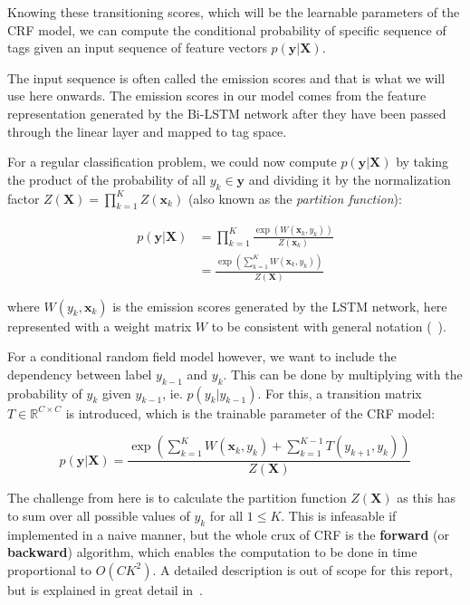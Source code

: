 Knowing these transitioning scores, which will be the learnable parameters of
the CRF model, we can compute the conditional probability of specific sequence
of tags given an input sequence of feature vectors $p(\bm{y}|\bm{X})$.

The input sequence is often called the emission scores and that is what we will
use here onwards. The emission scores in our model comes from the feature
representation generated by the Bi-LSTM network after they have been passed
through the linear layer and mapped to tag space. 

For a regular classification problem, we could now compute $p(\bm{y}|\bm{X})$ by
taking the product of the probability of all $y_{k} \in \bm{y}$ and dividing it
by the normalization factor $Z(\bm{X}) = \prod_{k=1}^{K} Z(\bm{x}_{k})$ (also
known as the \textit{partition function}):

\begin{align*}
p(\bm{y}|\bm{X}) & = \prod_{k=1}^{K} \frac{\exp( W(\bm{x}_{k}, y_{k}) )} 
                                            {Z(\bm{x}_{k})} \\
                 & = \frac{\exp( \sum_{k=1}^{K} W(\bm{x}_k, y_{k}) )}
                                            {Z(\bm{X})}
\end{align*}

where $W(y_{k}, \bm{x}_{k})$ is the emission scores generated by the LSTM
network, here represented with a weight matrix $W$ to be consistent with general
notation (~\cite{treviso2019crf}).

For a conditional random field model however, we want to include the
dependency between label $y_{k-1}$ and $y_{k}$. This can be done by multiplying
with the probability of $y_{k}$ given $y_{k-1}$, ie. $p(y_{k}|y_{k-1})$. For
this, a transition matrix $T \in \mathbb{R}^{C \times C}$ is introduced, which 
is the trainable parameter of the CRF model:

\begin{equation*}
p(\bm{y}|\bm{X}) = \frac{\exp( \sum_{k=1}^{K} W(\bm{x}_k, y_{k}) +
                    \sum_{k=1}^{K-1} T(y_{k+1}, y_{k}) )}{Z(\bm{X})}
\end{equation*}

The challenge from here is to calculate the partition function $Z(\bm{X})$ as
this has to sum over all possible values of $y_{k}$ for all $1 \leq K$. This is
infeasable if implemented in a naive manner, but the whole crux of CRF is the
\textbf{forward} (or \textbf{backward}) algorithm, which enables the computation
to be done in time proportional to $O(CK^{2})$. A detailed description is out of
scope for this report, but is explained in great detail
in~\cite{sutton2012introduction}.

